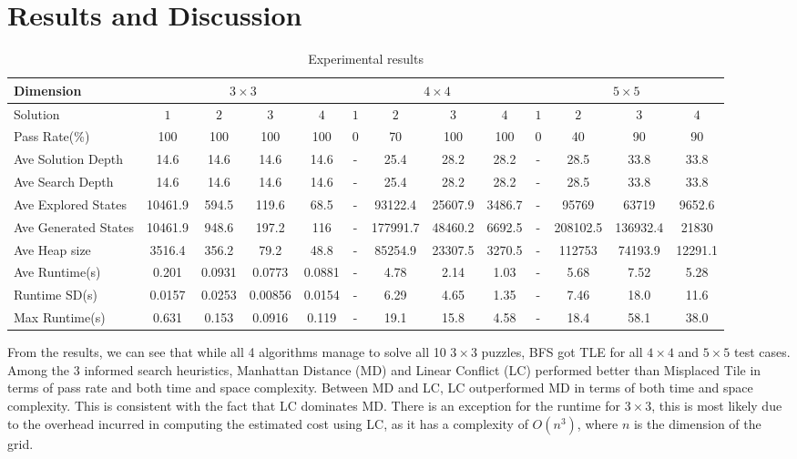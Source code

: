 \documentclass{llncs}
\begin{document}
\section{Results and Discussion}
\begin{table}
	\centering
	\begin{tabular}{l|c|c|c|c|c|c|c|c|c|c|c|c} \hline
		Dimension & \multicolumn{4}{c|}{$3 \times 3$} & \multicolumn{4}{c|}{$4 \times 4$} & \multicolumn{4}{c}{$5 \times 5$} \\\hline
		Solution & $1$ & $2$ & $3$ & $4$ & $1$ & $2$ & $3$ & $4$ & $1$ & $2$ & $3$ & $4$ \\\hline
		Pass Rate(\%) & 100 & 100 & 100 & 100 & 0 & 70 & 100 & 100 & 0 & 40 & 90 & 90 \\\hline
		Ave Solution Depth & 14.6 & 14.6 & 14.6 & 14.6 & - & 25.4 & 28.2 & 28.2 & - & 28.5 & 33.8 & 33.8 \\\hline
		Ave Search Depth & 14.6 & 14.6 & 14.6 & 14.6 & - & 25.4 & 28.2 & 28.2 & - & 28.5 & 33.8 & 33.8 \\\hline
		Ave Explored States & 10461.9 & 594.5 & 119.6 & 68.5 & - & 93122.4 & 25607.9 & 3486.7 & - & 95769 & 63719 & 9652.6 \\\hline
		Ave Generated States & 10461.9 & 948.6 & 197.2 & 116 & - & 177991.7 & 48460.2 & 6692.5 & - & 208102.5 & 136932.4 & 21830 \\\hline
		Ave Heap size & 3516.4 & 356.2 & 79.2 & 48.8 & - & 85254.9 & 23307.5 & 3270.5 & - & 112753 & 74193.9 & 12291.1 \\\hline
		Ave Runtime(s) & 0.201 & 0.0931 & 0.0773 & 0.0881 & - & 4.78 & 2.14 & 1.03 & - & 5.68 & 7.52 & 5.28 \\\hline
		Runtime SD(s) & 0.0157 & 0.0253 & 0.00856 & 0.0154 & - & 6.29 & 4.65 & 1.35 & - & 7.46 & 18.0 & 11.6 \\\hline
		Max Runtime(s) & 0.631 & 0.153 & 0.0916 & 0.119 & - & 19.1 & 15.8 & 4.58 & - & 18.4 & 58.1 & 38.0 \\\hline
	\end{tabular}
	\caption{Experimental results}
	\label{tab:one}
\end{table}
From the results, we can see that while all 4 algorithms manage to solve all 10 $3 \times 3$ puzzles, BFS got TLE for all $4 \times 4$ and $5 \times 5$ test cases. Among the 3 informed search heuristics, Manhattan Distance (MD) and Linear Conflict (LC) performed better than Misplaced Tile in terms of pass rate and both time and space complexity. Between MD and LC, LC outperformed MD in terms of both time and space complexity. This is consistent with the fact that LC dominates MD. There is an exception for the runtime for $3 \times 3$, this is most likely due to the overhead incurred in computing the estimated cost using LC, as it has a complexity of $O(n^3)$, where $n$ is the dimension of the grid.
\end{document}

